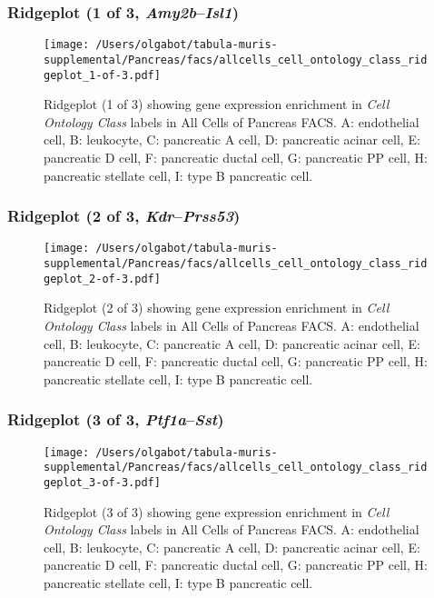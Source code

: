 \clearpage

\subsubsection{Ridgeplot (1 of 3, \emph{Amy2b}--\emph{Isl1})}
\begin{figure}[h]
\centering
\texttt{[image: /Users/olgabot/tabula-muris-supplemental/Pancreas/facs/allcells\_cell\_ontology\_class\_ridgeplot\_1-of-3.pdf]}

\caption{ Ridgeplot (1 of 3)  showing gene expression enrichment in \emph{Cell Ontology Class} labels in All Cells of Pancreas FACS. A: endothelial cell, B: leukocyte, C: pancreatic A cell, D: pancreatic acinar cell, E: pancreatic D cell, F: pancreatic ductal cell, G: pancreatic PP cell, H: pancreatic stellate cell, I: type B pancreatic cell.}
\end{figure}


\clearpage

\subsubsection{Ridgeplot (2 of 3, \emph{Kdr}--\emph{Prss53})}
\begin{figure}[h]
\centering
\texttt{[image: /Users/olgabot/tabula-muris-supplemental/Pancreas/facs/allcells\_cell\_ontology\_class\_ridgeplot\_2-of-3.pdf]}

\caption{ Ridgeplot (2 of 3)  showing gene expression enrichment in \emph{Cell Ontology Class} labels in All Cells of Pancreas FACS. A: endothelial cell, B: leukocyte, C: pancreatic A cell, D: pancreatic acinar cell, E: pancreatic D cell, F: pancreatic ductal cell, G: pancreatic PP cell, H: pancreatic stellate cell, I: type B pancreatic cell.}
\end{figure}


\clearpage

\subsubsection{Ridgeplot (3 of 3, \emph{Ptf1a}--\emph{Sst})}
\begin{figure}[h]
\centering
\texttt{[image: /Users/olgabot/tabula-muris-supplemental/Pancreas/facs/allcells\_cell\_ontology\_class\_ridgeplot\_3-of-3.pdf]}

\caption{ Ridgeplot (3 of 3)  showing gene expression enrichment in \emph{Cell Ontology Class} labels in All Cells of Pancreas FACS. A: endothelial cell, B: leukocyte, C: pancreatic A cell, D: pancreatic acinar cell, E: pancreatic D cell, F: pancreatic ductal cell, G: pancreatic PP cell, H: pancreatic stellate cell, I: type B pancreatic cell.}
\end{figure}


